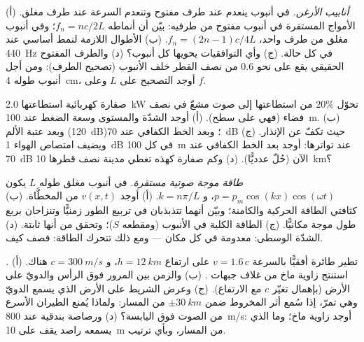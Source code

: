 \begin{exercise}[$\star\star$]\label{exo:b2:sound-waves:8}
\emph{أنابيب الأرغن.} في أنبوب ينعدم  عند طرف مفتوح
وتنعدم السرعة عند طرف مغلق. (أ) الأمواج المستقرة في أنبوب
مفتوح من طرفيه: بيّن أن أنماطه $f_n = nc/2L$؛ وفي أنبوب مغلق من
طرف واحد، $f_n = (2n - 1)c/4L$. (ب) الأطوال اللازمة لنمط أساسي عند \qty{440}{Hz}
في كل حالة. (ج) وأي التوافقيات يحويها كل أنبوب؟ (د) والطرف
المفتوح الحقيقي يقع على نحو $0.6$ من نصف القطر خلف الأنبوب (تصحيح الطرف): ومن أجل
أنبوب طوله \qty{4}{cm}، أوجد التصحيح على $L$ وعلى $f$.
\end{exercise}

\begin{exercise}[$\star\star$]\label{exo:b2:sound-waves:9}
صفارة كهربائية استطاعتها \qty{2.0}{kW} تحوّل $20\%$ من استطاعتها إلى صوت
مشعّ في نصف فضاء (فهي على سطح). (أ) أوجد الشدّة والمستوى
وسعة الضغط عند \qty{100}{m}. (ب) وبعد عتبة الألم
(\qty{120}{dB})؛ وبعد الخط الكفافي عند \qty{70}{dB} حيث تكفّ عن الإنذار.
(ج) ويضيف امتصاص الهواء \qty{1}{dB} في كل \qty{100}{m} عند تواترها:
أوجد بعد الخط الكفافي عند \qty{70}{dB} الآن (حُلّ عدديًّا). (د) وكم
صفارة كهذه تغطي مدينة نصف قطرها \qty{10}{km}؟
\end{exercise}

\begin{exercise}[$\star\star\star$]\label{exo:b2:sound-waves:10}
\emph{طاقة موجة صوتية مستقرة.} في أنبوب مغلق طوله $L$
يكون  $p = p_m\cos(kx)\cos(\omega t)$، و $k = n\pi/L$. (أ) أوجد $v(x,
t)$ من  المخطَّاة. (ب) كثافتي الطاقة الحركية
والكامنة؛ وبيّن أنهما تتذبذبان في تربيع الطور زمنيًّا
وتنزاحان بربع طول موجة مكانيًّا. (ج) الطاقة الكلية في
الأنبوب (ومقطعه $S$)؛ وتحقق من أنها ثابتة. (د) الشدّة الوسطى:
معدومة في كل مكان --- ومع ذلك تتحرك الطاقة: فصف كيف.
\end{exercise}

\begin{exercise}[$\star\star\star$]\label{exo:b2:sound-waves:11}
\emph{.} تطير طائرة أفقيًّا بالسرعة $v = 1.6\,c$ على
ارتفاع $h = \qty{12}{km}$، و $c = \qty{300}{m/s}$ هناك. (أ) استنتج زاوية
ماخ من غلاف جبهات . (ب) والزمن بين
المرور فوق الرأس والدويّ على الأرض (بإهمال تغيّر
$c$ مع الارتفاع). (ج) وعرض الشريط على الأرض الذي يسمع
الدويّ وهي تمرّ، إذا سُمع أثر المخروط ضمن
$\pm\qty{30}{km}$ من المسار: ولماذا يُمنع الطيران الأسرع من الصوت
فوق اليابسة؟ (د) ورصاصة بندقية عند \qty{800}{m/s}: أوجد زاوية ماخ؛
وما الذي يسمعه راصد يقف على \qty{10}{m} من المسار، وبأي ترتيب.
\end{exercise}

